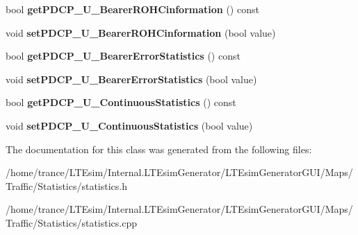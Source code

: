 \begin{DoxyCompactItemize}
\item 
bool {\bfseries get\+P\+D\+C\+P\+\_\+\+U\+\_\+\+Bearer\+R\+O\+H\+Cinformation} () const \hypertarget{class_statistics_a624cf92aacc80cf6e2e36125fb4733c7}{}\label{class_statistics_a624cf92aacc80cf6e2e36125fb4733c7}

\item 
void {\bfseries set\+P\+D\+C\+P\+\_\+\+U\+\_\+\+Bearer\+R\+O\+H\+Cinformation} (bool value)\hypertarget{class_statistics_ac86e3be53391e78cca493438267ce870}{}\label{class_statistics_ac86e3be53391e78cca493438267ce870}

\item 
bool {\bfseries get\+P\+D\+C\+P\+\_\+\+U\+\_\+\+Bearer\+Error\+Statistics} () const \hypertarget{class_statistics_a0bae9ca5343250a64a808865b770153f}{}\label{class_statistics_a0bae9ca5343250a64a808865b770153f}

\item 
void {\bfseries set\+P\+D\+C\+P\+\_\+\+U\+\_\+\+Bearer\+Error\+Statistics} (bool value)\hypertarget{class_statistics_a90a37e9d3d3e88e4532b2fdaa1988124}{}\label{class_statistics_a90a37e9d3d3e88e4532b2fdaa1988124}

\item 
bool {\bfseries get\+P\+D\+C\+P\+\_\+\+U\+\_\+\+Continuous\+Statistics} () const \hypertarget{class_statistics_a465c87cdb69e830b2ab11e050dc1e13b}{}\label{class_statistics_a465c87cdb69e830b2ab11e050dc1e13b}

\item 
void {\bfseries set\+P\+D\+C\+P\+\_\+\+U\+\_\+\+Continuous\+Statistics} (bool value)\hypertarget{class_statistics_a8350db6c4158bc8e34a8ef2a1cd82ae3}{}\label{class_statistics_a8350db6c4158bc8e34a8ef2a1cd82ae3}

\end{DoxyCompactItemize}


The documentation for this class was generated from the following files\+:\begin{DoxyCompactItemize}
\item 
/home/trance/\+L\+T\+Esim/\+Internal.\+L\+T\+Esim\+Generator/\+L\+T\+Esim\+Generator\+G\+U\+I/\+Maps/\+Traffic/\+Statistics/statistics.\+h\item 
/home/trance/\+L\+T\+Esim/\+Internal.\+L\+T\+Esim\+Generator/\+L\+T\+Esim\+Generator\+G\+U\+I/\+Maps/\+Traffic/\+Statistics/statistics.\+cpp\end{DoxyCompactItemize}
